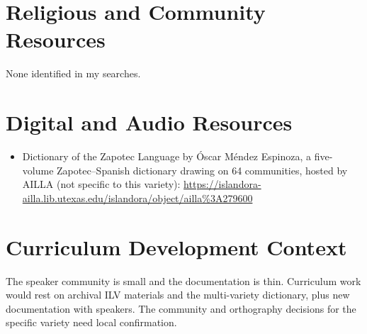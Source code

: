 \documentclass[12pt]{article}
\begin{document}
\section{Religious and Community Resources}
None identified in my searches.

\section{Digital and Audio Resources}
\begin{itemize}
\item Dictionary of the Zapotec Language by \'Oscar M\'endez Espinoza, a five-volume Zapotec--Spanish dictionary drawing on 64 communities, hosted by AILLA (not specific to this variety): \url{https://islandora-ailla.lib.utexas.edu/islandora/object/ailla%3A279600}
\end{itemize}

\section{Curriculum Development Context}
The speaker community is small and the documentation is thin. Curriculum work would rest on archival ILV materials and the multi-variety dictionary, plus new documentation with speakers. The community and orthography decisions for the specific variety need local confirmation.
\end{document}
